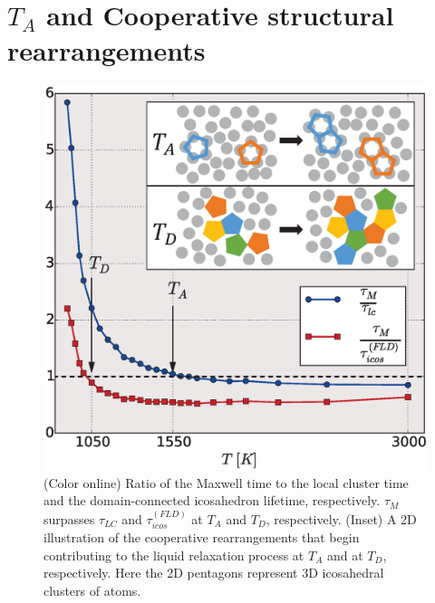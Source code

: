 \documentclass[aps,prl,preprint,showpacs,amsmath,floatfix,superscriptaddress]{revtex4}
\begin{document}
\section{$T_{A}$ and Cooperative structural rearrangements}

\begin{figure}[t]
\includegraphics[scale=0.38]{timescales_cartoon.eps}
\caption{(Color online) Ratio of the Maxwell time to the local
cluster time and the domain-connected icosahedron lifetime,
respectively. $\tau_{M}$ surpasses $\tau_{LC}$ and
$\tau^{(FLD)}_{icos}$ at $T_{A}$ and $T_{D}$, respectively.
(Inset) A 2D illustration of the cooperative rearrangements that
begin contributing to the liquid relaxation process at $T_{A}$ and
at $T_{D}$, respectively. Here the 2D pentagons represent 3D
icosahedral clusters of atoms.} \label{fig:timescales}
\end{figure}
\end{document}
